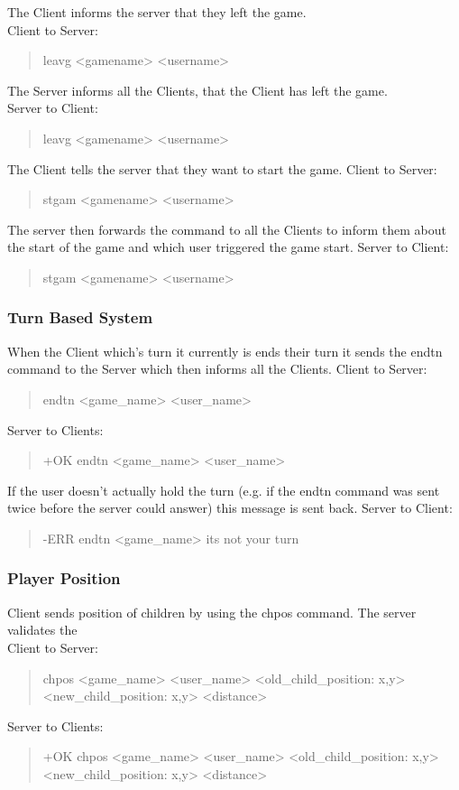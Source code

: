 \documentclass[a4paper,11pt]{article}
\begin{document}
\noindent
The Client informs the server that they left the game.\\
Client to Server:
\begin{quote}
  leavg <gamename> <username>
\end{quote}

\noindent
The Server informs all the Clients, that the Client has left the game.\\
Server to Client:
\begin{quote}
  leavg <gamename> <username>
\end{quote}

\noindent
The Client tells the server that they want to start the game.
Client to Server:
\begin{quote}
  stgam <gamename> <username>
\end{quote}

\noindent
The server then forwards the command to all the Clients to inform them about the start of the game and which user triggered the game start.
Server to Client:
\begin{quote}
  stgam <gamename> <username>
\end{quote}


\subsubsection{Turn Based System}
When the Client which's turn it currently is ends their turn it sends the endtn command to the Server which then informs all the Clients.
Client to Server:
\begin{quote}
  endtn <game\_name> <user\_name>
\end{quote}
\noindent
Server to Clients:
\begin{quote}
  +OK endtn <game\_name> <user\_name>
\end{quote}
\noindent
If the user doesn't actually hold the turn (e.g. if the endtn command was sent twice before the server could answer) this message is sent back.
Server to Client:
\begin{quote}
  -ERR endtn <game\_name> its not your turn
\end{quote}

\subsubsection{Player Position}
Client sends position of children by using the chpos command. The server validates the \\
Client to Server:
\begin{quote}
  chpos <game\_name> <user\_name> <old\_child\_position: x,y> <new\_child\_position: x,y> <distance>
\end{quote}
\noindent
Server to Clients:
\begin{quote}
  +OK chpos <game\_name> <user\_name> <old\_child\_position: x,y> <new\_child\_position: x,y> <distance>
\end{quote}
\clearpage  
\end{document}
